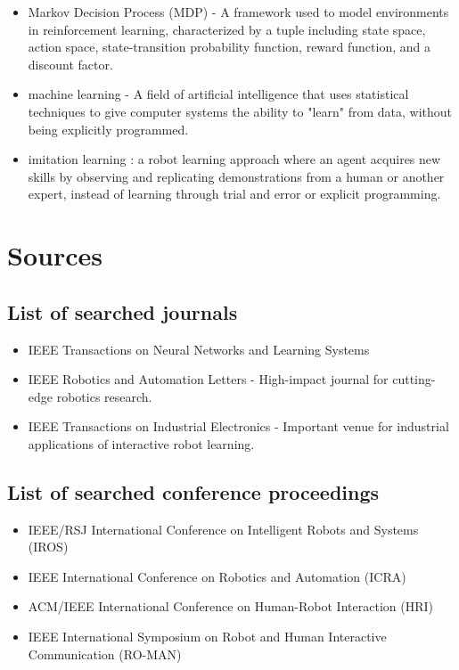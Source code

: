 \documentclass[report.tex]{subfiles}
\begin{document}
\begin{itemize}
                \item Markov Decision Process (MDP) - A framework used to model environments in reinforcement learning, characterized by a tuple including state space, action space, state-transition probability function, reward function, and a discount factor. 
                \item machine learning - A field of artificial intelligence that uses statistical techniques to give computer systems the ability to "learn" from data, without being explicitly programmed.
                \item imitation learning : a robot learning approach where an agent acquires new skills by observing and replicating demonstrations from a human or another expert, instead of learning through trial and error or explicit programming.
            \end{itemize}


            
        \section{Sources}
            \subsection{List of searched journals}
            \begin{itemize}
                \item {IEEE Transactions on Neural Networks and Learning Systems  } 
                \item {IEEE Robotics and Automation Letters - High-impact journal for cutting-edge robotics research.} 
                \item {IEEE Transactions on Industrial Electronics - Important venue for industrial applications of interactive robot learning.}
                
            \end{itemize}
            
            \subsection{List of searched conference proceedings}
            \begin{itemize}
                \item {IEEE/RSJ International Conference on Intelligent Robots and Systems (IROS) } 
                \item {IEEE International Conference on Robotics and Automation (ICRA)} 
                \item {ACM/IEEE International Conference on Human-Robot Interaction (HRI)} 
                \item {IEEE International Symposium on Robot and Human Interactive Communication (RO-MAN)} 
            \end{itemize}
            
\end{document}
